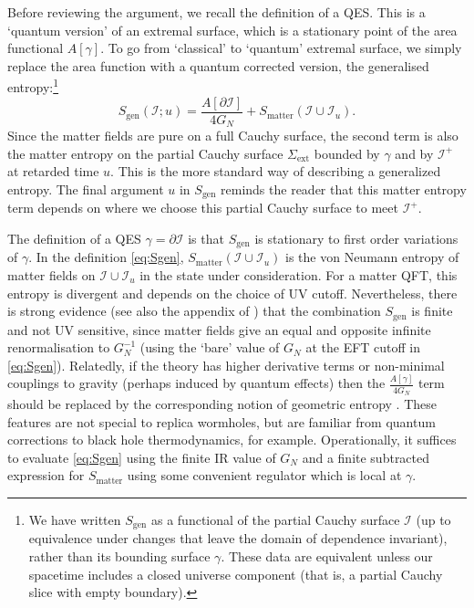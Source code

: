 \documentclass[letterpaper,12pt]{article}
\newcommand*{\scri}{\mathscr{I}} %
\newcommand*{\island}{\mathcal{I}}
\begin{document}
Before reviewing the argument, we recall the definition of a QES. This is a `quantum version' of an extremal surface, which is a stationary point of the area functional $A[\gamma]$. To go from `classical' to `quantum' extremal surface, we simply replace the area function with a quantum corrected version, the generalised entropy:\footnote{We have written $S_\mathrm{gen}$ as a functional of the partial Cauchy surface $\island$ (up to equivalence under changes that leave the domain of dependence invariant), rather than its bounding surface $\gamma$. These data are equivalent unless our spacetime includes a closed universe component (that is, a partial Cauchy slice with empty boundary).}
\begin{equation}\label{eq:Sgen}
	S_\mathrm{gen}(\island;u) = \frac{A[\partial\island]}{4G_N} + S_\mathrm{matter}(\island\cup\scri_u).
\end{equation}
Since the matter fields are pure on a full Cauchy surface, the second term is also the matter entropy on the partial Cauchy surface $\Sigma_\mathrm{ext}$ bounded by $\gamma$ and by $\scri^+$ at retarded time $u$.  This is the more standard way of describing a generalized entropy.
The final argument $u$ in $S_\mathrm{gen}$ reminds the reader that this matter entropy term depends on where we choose this partial Cauchy surface to meet $\scri^+$.

The definition of a QES $\gamma=\partial\island$ is that $S_\mathrm{gen}$ is stationary to first order variations of $\gamma$. In the definition \eqref{eq:Sgen}, $S_\mathrm{matter}(\island\cup\scri_u)$ is the von Neumann entropy of matter fields on $\island\cup\scri_u$ in the state under consideration. For a matter QFT, this entropy is divergent and depends on the choice of UV cutoff. Nevertheless, there is strong evidence  \cite{Susskind:1994sm,Jacobson:1994iw,Frolov:1996aj} (see also the appendix of \cite{Bousso:2015mna}) that the combination $S_\mathrm{gen}$ is finite and not UV sensitive, since matter fields give an equal and opposite infinite renormalisation to $G_N^{-1}$ (using the `bare' value of $G_N$ at the EFT cutoff in \eqref{eq:Sgen}). Relatedly, if the theory has higher derivative terms or non-minimal couplings to gravity (perhaps induced by quantum effects) then the $\frac{A[\gamma]}{4G_N}$ term should be replaced by the corresponding notion of geometric entropy \cite{Dong:2013qoa,Camps:2013zua,Miao:2014nxa}. These features are not special to replica wormholes, but are familiar from quantum corrections to black hole thermodynamics, for example. Operationally, it suffices to evaluate \eqref{eq:Sgen} using the finite IR value of $G_N$ and a finite subtracted expression for $S_\mathrm{matter}$ using some convenient regulator which is local at $\gamma$.
\end{document}
